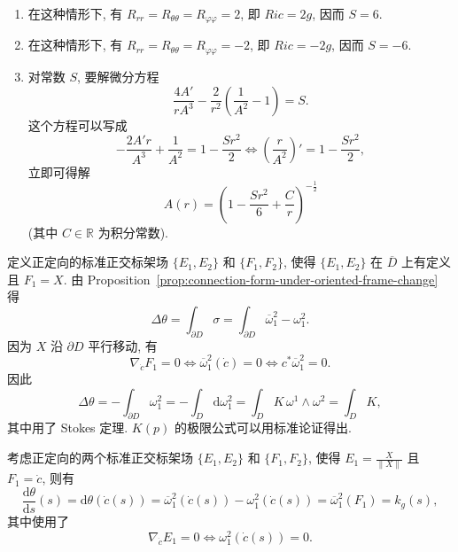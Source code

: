 \begin{description}[font=\normalfont,leftmargin=2em,labelwidth=1.5em]
\begin{enumerate}[label=(\alph*),ref=\alph*,leftmargin=*]
\begin{align*}
  R_{r\varphi r}{}^\varphi&=\Omega_r^\varphi(E_r,E_\varphi)=-\frac{A'}{rA^3};\\
  R_{\theta\varphi\theta}{}^\varphi&=\Omega_\theta^\varphi(E_\theta,E_\varphi)
    =\frac1{r^2}\left(\frac1{A^2}-1\right)
\end{align*}
(以及由对称性与这些分量相联系的分量). 因此 Ricci 张量在这组标准正交标架下的分量为
\begin{align*}
  R_{rr}&=R_{\theta rr}{}^\theta+R_{\varphi rr}{}^\varphi=\frac{2A'}{rA^3};\\
  R_{\theta\theta}&=R_{r\theta\theta}{}^r+R_{\varphi\theta\theta}{}^\varphi
    =\frac{A'}{rA^3}-\frac1{r^2}\left(\frac1{A^2}-1\right);\\
  R_{\varphi\varphi}&=R_{r\varphi\varphi}{}^r+R_{\theta\varphi\varphi}{}^\theta
    =\frac{A'}{rA^3}-\frac1{r^2}\left(\frac1{A^2}-1\right).
\end{align*}
于是标量曲率为
\[
  S=R_{rr}+R_{\theta\theta}+R_{\varphi\varphi}
      =\frac{4A'}{rA^3}-\frac2{r^2}\left(\frac1{A^2}-1\right).
\]
\item 在这种情形下, 有 $R_{rr}=R_{\theta\theta}=R_{\varphi\varphi}=2$, 即 $\mathit{Ric}=2g$, 因而 $S=6$.
\item 在这种情形下, 有 $R_{rr}=R_{\theta\theta}=R_{\varphi\varphi}=-2$, 即 $\mathit{Ric}=-2g$, 因而 $S=-6$.
\item 对常数 $S$, 要解微分方程
\[
  \frac{4A'}{rA^3}-\frac2{r^2}\left(\frac1{A^2}-1\right)=S.
\]
这个方程可以写成
\[
  -\frac{2A'r}{A^3}+\frac1{A^2}=1-\frac{Sr^2}{2}
   \iff \left(\frac r{A^2}\right)'=1-\frac{Sr^2}{2},
\]
立即可得解
\[
  A(r)=\left(1-\frac{Sr^2}{6}+\frac Cr\right)^{-\frac12}
\]
(其中 $C\in\mathbb{R}$ 为积分常数).
\end{enumerate}

定义正定向的标准正交标架场 $\{E_1,E_2\}$ 和 $\{F_1,F_2\}$, 使得 $\{E_1,E_2\}$ 在 $\overline D$ 上有定义且 $F_1=X$. 由 Proposition~\ref{prop:connection-form-under-oriented-frame-change} 得
\[
  \Delta\theta=\int_{\partial D}\sigma=\int_{\partial D}\overline\omega_1^2-\omega_1^2.
\]
因为 $X$ 沿 $\partial D$ 平行移动, 有
\[
  \nabla_{\dot c}F_1=0\iff\overline\omega_1^2(\dot c)=0\iff c^*\overline\omega_1^2=0.
\]
因此
\[
  \Delta\theta=-\int_{\partial D}\omega_1^2=-\int_D\mathrm{d}\omega_1^2
   =\int_DK\,\omega^1\wedge\omega^2=\int_DK,
\]
其中用了 Stokes 定理. $K(p)$ 的极限公式可以用标准论证得出.

考虑正定向的两个标准正交标架场 $\{E_1,E_2\}$ 和 $\{F_1,F_2\}$, 使得 $E_1=\frac X{\lVert X\rVert}$ 且 $F_1=\dot c$, 则有
\[
  \frac{\mathrm{d}\theta}{\mathrm{d}s}(s)=\mathrm{d}\theta(\dot c(s))
  =\overline\omega_1^2(\dot c(s))-\omega_1^2(\dot c(s))
  =\overline\omega_1^2(F_1)=k_g(s),
\]
其中使用了
\[
  \nabla_{\dot c}E_1=0\iff\omega_1^2(\dot c(s))=0.
\]
\end{description}

